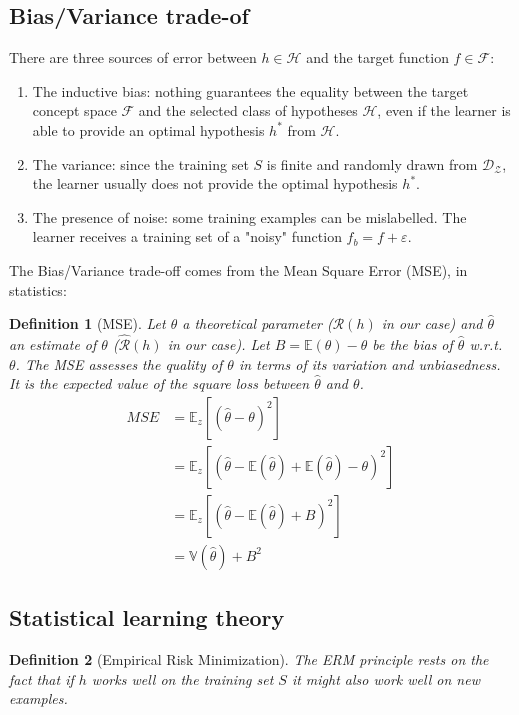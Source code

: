 \documentclass{article}
\newtheorem{defi}{Definition}
\begin{document}
\subsection{Bias/Variance trade-of}
There are three sources of error between $h\in \mathcal{H}$ and the target function $f\in \mathcal{F}$:
\begin{enumerate}
\item The inductive bias: nothing guarantees the equality between the target concept space $\mathcal{F}$ and the selected class of hypotheses $\mathcal{H}$, even if the learner is able to provide an optimal hypothesis $h^*$ from $\mathcal{H}$.
\item The variance: since the training set $S$ is finite and randomly drawn from $\mathcal{D}_{\mathcal{Z}}$, the learner usually does not provide the optimal hypothesis $h^*$.
\item The presence of noise: some training examples can be mislabelled. The
learner receives a training set of a "noisy" function $f_b = f + \varepsilon$.
\end{enumerate}

The Bias/Variance trade-off comes from the Mean Square Error (MSE), in statistics: 

\begin{defi}[MSE]
Let $\theta$ a theoretical parameter ($\mathcal{R}(h)$ in our case) and $\hat{\theta}$ an estimate of $\theta$ ($\hat{\mathcal{R}}(h)$ in our case). Let $B=\mathbb{E}(\theta) - \theta$ be the bias of $\hat{\theta}$ w.r.t. $\theta$. The MSE assesses the quality of $\theta$ in terms of its variation and unbiasedness. It is the expected value of the square loss between $\hat{\theta}$ and $\theta$.
\begin{align*}
MSE & = \mathbb{E}_z [(\hat{\theta}-\theta)^2]\\
&= \mathbb{E}_z[(\hat{\theta}-\mathbb{E}(\hat{\theta}) + \mathbb{E}(\hat{\theta})- \theta)^2]\\
&= \mathbb{E}_z[(\hat{\theta}-\mathbb{E}(\hat{\theta}) + B)^2]\\
& = \mathbb{V}(\hat{\theta}) + B^2
\end{align*}
\end{defi}


\subsection{Statistical learning theory}
\begin{defi}[Empirical Risk Minimization]
The ERM principle rests on the fact that if $h$ works well on the training set $S$ it might also work well on new examples.
\end{defi}
\end{document}
